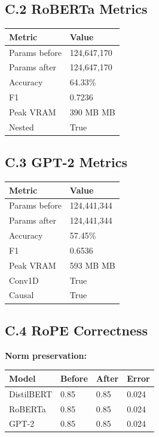 \subsection{C.2 RoBERTa Metrics}

\begin{table}[H]
\centering
\small
\begin{tabular}{ll}
\toprule
\textbf{Metric} & \textbf{Value} \\
\midrule
Params before & 124,647,170 \\
Params after & 124,647,170 \\
Accuracy & 64.33\% \\
F1 & 0.7236 \\
Peak VRAM & 390 MB MB \\
Nested & True \\
\bottomrule
\end{tabular}
\end{table}

\subsection{C.3 GPT-2 Metrics}

\begin{table}[H]
\centering
\small
\begin{tabular}{ll}
\toprule
\textbf{Metric} & \textbf{Value} \\
\midrule
Params before & 124,441,344 \\
Params after & 124,441,344 \\
Accuracy & 57.45\% \\
F1 & 0.6536 \\
Peak VRAM & 593 MB MB \\
Conv1D & True \\
Causal & True \\
\bottomrule
\end{tabular}
\end{table}

\subsection{C.4 RoPE Correctness}

\textbf{Norm preservation:}

\begin{table}[H]
\centering
\small
\begin{tabular}{llll}
\toprule
\textbf{Model} & \textbf{Before} & \textbf{After} & \textbf{Error} \\
\midrule
DistilBERT & 0.85 & 0.85 & 0.024 \\
RoBERTa & 0.85 & 0.85 & 0.024 \\
GPT-2 & 0.85 & 0.85 & 0.024 \\
\bottomrule
\end{tabular}
\end{table}

